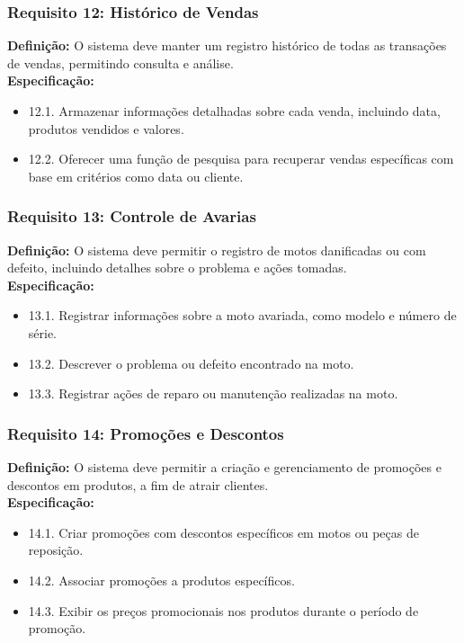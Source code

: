 \subsubsection{Requisito 12: Histórico de Vendas}
\textbf{Definição:} O sistema deve manter um registro histórico de todas as transações de vendas, permitindo consulta e análise.
\\
\textbf{Especificação:}
\begin{itemize}
	\item 12.1. Armazenar informações detalhadas sobre cada venda, incluindo data, produtos vendidos e valores.
	\item 12.2. Oferecer uma função de pesquisa para recuperar vendas específicas com base em critérios como data ou cliente.
\end{itemize}

\subsubsection{Requisito 13: Controle de Avarias}
\textbf{Definição:} O sistema deve permitir o registro de motos danificadas ou com defeito, incluindo detalhes sobre o problema e ações tomadas.
\\
\textbf{Especificação:}
\begin{itemize}
	\item 13.1. Registrar informações sobre a moto avariada, como modelo e número de série.
	\item 13.2. Descrever o problema ou defeito encontrado na moto.
	\item 13.3. Registrar ações de reparo ou manutenção realizadas na moto.
\end{itemize}

\subsubsection{Requisito 14: Promoções e Descontos}
\textbf{Definição:} O sistema deve permitir a criação e gerenciamento de promoções e descontos em produtos, a fim de atrair clientes.
\\
\textbf{Especificação:}
\begin{itemize}
	\item 14.1. Criar promoções com descontos específicos em motos ou peças de reposição.
	\item 14.2. Associar promoções a produtos específicos.
	\item 14.3. Exibir os preços promocionais nos produtos durante o período de promoção.
\end{itemize}

